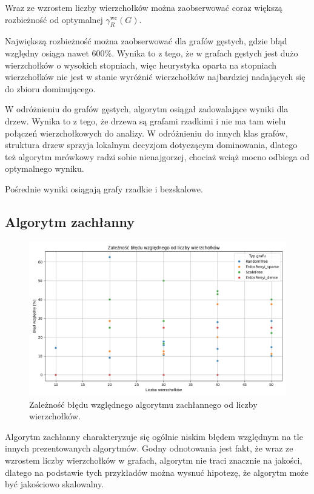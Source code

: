 Wraz ze wzrostem liczby wierzchołków można zaobserwować coraz większą rozbieżność od optymalnej $\gamma^{\text{wc}}_R(G)$.

Największą rozbieżność można zaobserwować dla grafów gęstych, gdzie błąd względny osiąga nawet 600\%. Wynika to z tego, że w grafach gęstych jest dużo wierzchołków o wysokich stopniach, więc heurystyka oparta na stopniach wierzchołków nie jest w stanie wyróżnić wierzchołków najbardziej nadających się do zbioru dominującego.

W odróżnieniu do grafów gęstych, algorytm osiągał zadowalające wyniki dla drzew. Wynika to z tego, że drzewa są grafami rzadkimi i nie ma tam wielu połączeń wierzchołkowych do analizy. W odróżnieniu do innych klas grafów, struktura drzew sprzyja lokalnym decyzjom dotyczącym dominowania, dlatego też algorytm mrówkowy radzi sobie nienajgorzej, chociaż wciąż mocno odbiega od optymalnego wyniku.

Pośrednie wyniki osiągają grafy rzadkie i bezskalowe.

\subsection{Algorytm zachłanny}

\begin{figure}[H]
    \centering
    \includegraphics[width=\textwidth]{assets/plots_approx/greedy.png}
    \caption{Zależność błędu względnego algorytmu zachłannego od liczby wierzchołków.}
    \label{fig:greedyPlot}
\end{figure}

Algorytm zachłanny charakteryzuje się ogólnie niskim błędem względnym na tle innych prezentowanych algorytmów. Godny odnotowania jest fakt, że wraz ze wzrostem liczby wierzchołków w grafach, algorytm nie traci znacznie na jakości, dlatego na podstawie tych przykładów można wysnuć hipotezę, że algorytm może być jakościowo skalowalny.

